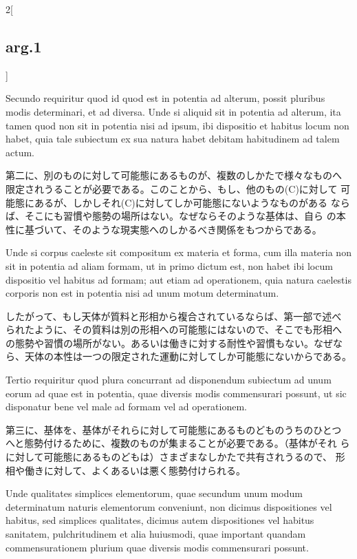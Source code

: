 \documentclass[paper=a4paper,fontsize=10pt,jafontsize=9pt,titlepage]{jlreq}
\begin{document}
\begin{paracol}{2}[\subsection{arg.1}]
\switchcolumn*

Secundo
requiritur quod id quod est in potentia ad alterum, possit pluribus
modis determinari, et ad diversa. Unde si aliquid sit in potentia ad
alterum, ita tamen quod non sit in potentia nisi ad ipsum, ibi
dispositio et habitus locum non habet, quia tale subiectum ex sua
natura habet debitam habitudinem ad talem actum.

\switchcolumn

第二に、別のものに対して可能態にあるものが、複数のしかたで様々なものへ
限定されうることが必要である。このことから、もし、他のもの(C)に対して
可能態にあるが、しかしそれ(C)に対してしか可能態にないようなものがある
ならば、そこにも習慣や態勢の場所はない。なぜならそのような基体は、自ら
の本性に基づいて、そのような現実態へのしかるべき関係をもつからである。

\switchcolumn*

Unde si corpus
caeleste sit compositum ex materia et forma, cum illa materia non sit
in potentia ad aliam formam, ut in primo dictum est, non habet ibi
locum dispositio vel habitus ad formam; aut etiam ad operationem, quia
natura caelestis corporis non est in potentia nisi ad unum motum
determinatum.

\switchcolumn

したがって、もし天体が質料と形相から複合されているならば、第一部で述べ
られたように、その質料は別の形相への可能態にはないので、そこでも形相へ
の態勢や習慣の場所がない。あるいは働きに対する耐性や習慣もない。なぜな
ら、天体の本性は一つの限定された運動に対してしか可能態にないからである。

\switchcolumn*

Tertio requiritur quod plura concurrant ad disponendum
subiectum ad unum eorum ad quae est in potentia, quae diversis modis
commensurari possunt, ut sic disponatur bene vel male ad formam vel ad
operationem.

\switchcolumn

第三に、基体を、基体がそれらに対して可能態にあるものどものうちのひとつ
へと態勢付けるために、複数のものが集まることが必要である。（基体がそれ
らに対して可能態にあるものどもは）さまざまなしかたで共有されうるので、
形相や働きに対して、よくあるいは悪く態勢付けられる。

\switchcolumn*

Unde qualitates simplices elementorum, quae secundum unum
modum determinatum naturis elementorum conveniunt, non dicimus
dispositiones vel habitus, sed simplices qualitates, dicimus autem
dispositiones vel habitus sanitatem, pulchritudinem et alia huiusmodi,
quae important quandam commensurationem plurium quae diversis modis
commensurari possunt.


\end{paracol}
\end{document}
